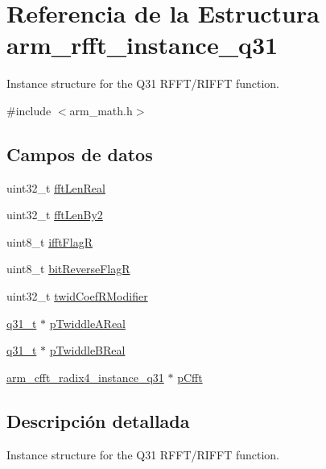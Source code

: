 \hypertarget{structarm__rfft__instance__q31}{}\section{Referencia de la Estructura arm\+\_\+rfft\+\_\+instance\+\_\+q31}
\label{structarm__rfft__instance__q31}


Instance structure for the Q31 R\+F\+F\+T/\+R\+I\+F\+FT function.  




{\ttfamily \#include $<$arm\+\_\+math.\+h$>$}

\subsection*{Campos de datos}
\begin{DoxyCompactItemize}
\item 
uint32\+\_\+t \hyperlink{structarm__rfft__instance__q31_adf0d4604cf5546075d9d4cf122d6c986}{fft\+Len\+Real}
\item 
uint32\+\_\+t \hyperlink{structarm__rfft__instance__q31_ae7db13e0e2999656d98c4223de5b1284}{fft\+Len\+By2}
\item 
uint8\+\_\+t \hyperlink{structarm__rfft__instance__q31_a787d72055c89e4d62b188d6bd646341c}{ifft\+FlagR}
\item 
uint8\+\_\+t \hyperlink{structarm__rfft__instance__q31_ad56ec2425e2422108b8767b43d944591}{bit\+Reverse\+FlagR}
\item 
uint32\+\_\+t \hyperlink{structarm__rfft__instance__q31_a5b06f7f76c018db993fe6acc5708c589}{twid\+Coef\+R\+Modifier}
\item 
\hyperlink{arm__math_8h_adc89a3547f5324b7b3b95adec3806bc0}{q31\+\_\+t} $\ast$ \hyperlink{structarm__rfft__instance__q31_a059faa282f9186687d843ead4a7a0d7e}{p\+Twiddle\+A\+Real}
\item 
\hyperlink{arm__math_8h_adc89a3547f5324b7b3b95adec3806bc0}{q31\+\_\+t} $\ast$ \hyperlink{structarm__rfft__instance__q31_a611c385424ce77519f599980f96d5846}{p\+Twiddle\+B\+Real}
\item 
\hyperlink{structarm__cfft__radix4__instance__q31}{arm\+\_\+cfft\+\_\+radix4\+\_\+instance\+\_\+q31} $\ast$ \hyperlink{structarm__rfft__instance__q31_a0b1f4a05c1824bab3b9bd837a260232a}{p\+Cfft}
\end{DoxyCompactItemize}


\subsection{Descripción detallada}
Instance structure for the Q31 R\+F\+F\+T/\+R\+I\+F\+FT function. 

